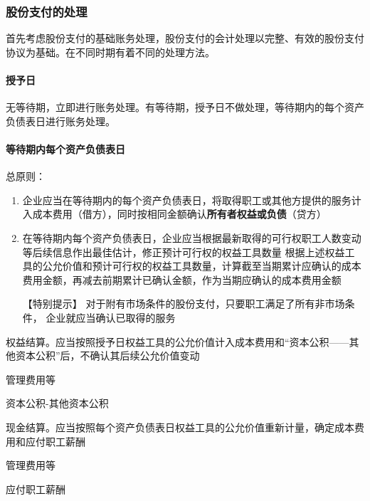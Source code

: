 \documentclass[UTF8,12pt]{ctexart}
\newenvironment{Dr}{%
	\begin{list}{}%
		{
			\setlength{\leftmargin}{2em}
			\setlength{\labelwidth}{2em}
			\setlength{\labelsep}{0pt}
			\setlength{\itemindent}{0pt}
			\setlength{\listparindent}{0pt}
			\setlength{\parsep}{0pt}
			\setlength{\topsep}{0pt}
		}
		\item[\textbf{借：}]
	}{%
	\end{list}
}
\newenvironment{Cr}{%
	\begin{list}{}%
		{
			\setlength{\leftmargin}{2em}
			\setlength{\labelwidth}{2em}
			\setlength{\labelsep}{0pt}
			\setlength{\itemindent}{0pt}
			\setlength{\listparindent}{0pt}
			\setlength{\parsep}{0pt}
			\setlength{\topsep}{0pt}
		}
		\item[\textbf{贷：}]
	}{%
	\end{list}
}
\numberwithin{equation}{section} %
\numberwithin{figure}{section}
\numberwithin{table}{section}
\begin{document}
	\subsubsection{股份支付的处理}
	首先考虑股份支付的基础账务处理，股份支付的会计处理以完整、有效的股份支付协议为基础。在不同时期有着不同的处理方法。
	
	\paragraph{授予日}
	无等待期，立即进行账务处理。有等待期，授予日不做处理，等待期内的每个资产负债表日进行账务处理。
	
	\paragraph{等待期内每个资产负债表日}
	总原则：
	\begin{enumerate}
		\item 企业应当在等待期内的每个资产负债表日，将取得职工或其他方提供的服务计入成本费用（借方），同时按相同金额确认\textbf{所有者权益或负债}（贷方）
		
		\item 在等待期内每个资产负债表日，企业应当根据最新取得的可行权职工人数变动等后续信息作出最佳估计，修正预计可行权的权益工具数量
		根据上述权益工具的公允价值和预计可行权的权益工具数量，计算截至当期累计应确认的成本费用金额，再减去前期累计已确认金额，作为当期应确认的成本费用金额
		
		【特别提示】
		对于附有市场条件的股份支付，只要职工满足了所有非市场条件， 企业就应当确认已取得的服务
		
	\end{enumerate}

	权益结算。应当按照授予日权益工具的公允价值计入成本费用和“资本公积——其他资本公积”后，不确认其后续公允价值变动
	
	\begin{Dr}
		管理费用等
	\end{Dr}
	\begin{Cr}
		资本公积-其他资本公积
	\end{Cr}
	
	现金结算。应当按照每个资产负债表日权益工具的公允价值重新计量，确定成本费用和应付职工薪酬
	
	\begin{Dr}
		管理费用等
	\end{Dr}
	\begin{Cr}
		应付职工薪酬
	\end{Cr}
	
\end{document}
